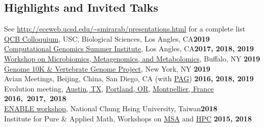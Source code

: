 \documentclass[margin,line,letterpaper]{resume}
\begin{document}
\begin{resume}
    
    
        \section{\mysidestyle Highlights and Invited Talks}
        See \url{http://eceweb.ucsd.edu/~smirarab/presentations.html} for a complete list\vspace{2mm}\\
      \href{https://uscbiscgrad.blogspot.com/2019/10/dr.html}{QCB Colloquium}, USC, Biological Sciences, Los Angles, CA\hfill \textbf{2019}\\
        \href{http://computationalgenomics.bioinformatics.ucla.edu/schedule/}{Computational Genomics Summer Institute}, Los Angles, CA\hfill \textbf{2017, 2018, 2019}\\
        \href{https://sites.google.com/view/mmm2019/home}{Workshop on Microbiomics, Metagenomics, and Metabolomics}, Buffalo, NY  \hfill \textbf{2019}\\
         \href{https://www.eventbrite.com/e/the-g10k-vgpebp-meeting-tickets-59112745814?aff=ebdshpsearchautocomplete}{Genome 10K \& Vertebrate Genome Project}, New York, NY \hfill \textbf{2019}\\
        Avian Meetings, Beijing, China,  San Diego, CA (with \href{https://pag.confex.com/pag/xxvii/meetingapp.cgi/Paper/36191}{PAG}) \hfill \textbf{2016, 2018, 2019}\\
        Evolution meeting,  \href{https://www.evolutionmeetings.org/uploads/4/8/8/0/48804503/evolution_2016_final_pdf_program.pdf}{Austin, TX},  \href{http://www.evolutionmeetings.org/uploads/4/8/8/0/48804503/final_evol2017_program.pdf}{Portland, OR}, \href{http://tandy.cs.illinois.edu/PhyloSynth-Symp2018.html}{Montpellier, France} \hfill \textbf{2016,~2017,~2018}\\
 \href{http://enable.nchu.edu.tw/international-page.php?uuid=f46f7f64-399e-11e9-97aa-309c231618d5}{ENABLE workshop},         National Chung Hsing University, Taiwan\hfill \textbf{2018}\\
        Institute for Pure \& Applied Math, Workshops on \href{http://www.ipam.ucla.edu/programs/workshops/multiple-sequence-alignment/?tab=speaker-list}{MSA} and \href{http://www.ipam.ucla.edu/programs/workshops/workshop-iii-hpc-for-computationally-and-data-intensive-problems/?tab=speaker-list}{HPC} \hfill \textbf{2015, 2018}\\

\end{resume}
\end{document}
